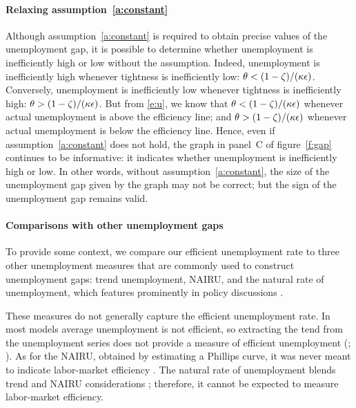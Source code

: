 \documentclass[letterpaper,12pt,leqno]{article}
\begin{document}
\paragraph{Relaxing assumption~\ref{a:constant}} Although assumption~\ref{a:constant} is required to obtain precise values of the unemployment gap, it is possible to determine whether unemployment is inefficiently high or low without the assumption. Indeed, unemployment is inefficiently high whenever tightness is inefficiently low: $\theta < (1-\zeta)/(\kappa\epsilon)$. Conversely, unemployment is inefficiently low whenever tightness is inefficiently high: $\theta > (1-\zeta)/(\kappa\epsilon)$. But from \eqref{e:u}, we know that $\theta < (1-\zeta)/(\kappa\epsilon)$ whenever actual unemployment is above the efficiency line; and $\theta > (1-\zeta)/(\kappa\epsilon)$ whenever actual unemployment is below the efficiency line. Hence, even if assumption~\ref{a:constant} does not hold, the graph in panel~C of figure~\ref{f:gap} continues to be informative: it indicates whether unemployment is inefficiently high or low. In other words, without assumption~\ref{a:constant}, the size of the unemployment gap given by the graph may not be correct; but the sign of the unemployment gap remains valid.

\paragraph{Comparisons with other unemployment gaps} To provide some context, we compare our efficient unemployment rate to three other unemployment measures that are commonly used to construct unemployment gaps: trend unemployment, NAIRU, and the natural rate of unemployment, which features prominently in policy discussions . 

These measures do not generally capture the efficient unemployment rate. In most models average unemployment is not efficient, so extracting the tend from the unemployment series does not provide a measure of efficient unemployment (; ). As for the NAIRU, obtained by estimating a Phillips curve, it was never meant to indicate labor-market efficiency . The natural rate of unemployment blends trend and NAIRU considerations ; therefore, it cannot be expected to measure labor-market efficiency.
\end{document}
